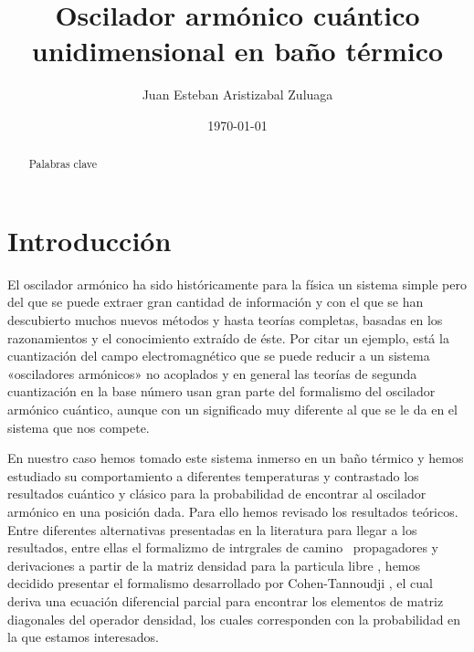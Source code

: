 \documentclass[%
 reprint,
 amsmath,amssymb,
 aps,
 pra,
]{revtex4-2}
\begin{document}

\title{Oscilador armónico cuántico unidimensional en baño térmico}%

\author{Juan Esteban Aristizabal Zuluaga}

\date{\today}%

\begin{abstract}

\begin{description}
\item[Palabras clave]
\end{description}
\end{abstract}

\maketitle


\section{\label{sec:Intro}Introducción}
El oscilador armónico ha sido históricamente para la física un sistema simple pero del que se puede extraer gran cantidad de información y con el que se han descubierto muchos nuevos métodos y hasta teorías completas, basadas en los razonamientos y el conocimiento extraído de éste. Por citar un ejemplo, está la cuantización del campo electromagnético que se puede reducir a un sistema «osciladores armónicos» no acoplados y en general las teorías de segunda cuantización en la base número usan gran parte del formalismo del oscilador armónico cuántico, aunque con un significado muy diferente al que se le da en el sistema que nos compete. 

En nuestro caso hemos tomado  este sistema inmerso en un baño térmico y hemos estudiado su comportamiento a diferentes temperaturas y contrastado los resultados cuántico y clásico para la probabilidad de encontrar al oscilador armónico en una posición dada. Para ello hemos revisado los resultados teóricos. Entre diferentes alternativas presentadas en la literatura para llegar a los resultados, entre ellas el formalizmo de intrgrales de camino \, propagadores \cite{Kheirandish2018}  y derivaciones a partir de la matriz densidad para la particula libre \cite{RichardP.Feynmann1972}, hemos decidido presentar el formalismo desarrollado por Cohen-Tannoudji \cite{Cohen-Tannoudji}, el cual deriva una ecuación diferencial parcial para encontrar los elementos de matriz diagonales del operador densidad, los cuales corresponden con la probabilidad en la que estamos interesados.
\end{document}
